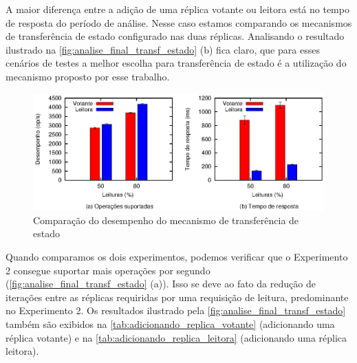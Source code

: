 A maior diferença entre a adição de uma réplica votante ou leitora está no tempo de
resposta do período de análise. Nesse caso estamos comparando os mecanismos de
transferência de estado configurado nas duas réplicas. Analisando o resultado ilustrado na
\autoref{fig:analise_final_transf_estado} (b) fica claro, que para esses cenários de
testes a melhor escolha para transferência de estado é a utilização do mecanismo proposto
por esse trabalho.

\begin{figure}[ht]
  \centering
  \includegraphics[width=14cm]{conteudo/capitulos/figuras/final-transf-estado.eps}
  \caption{Comparação do desempenho do mecanismo de transferência de estado}
  \label{fig:analise_final_transf_estado}
\end{figure}

Quando comparamos os dois experimentos, podemos verificar que o Experimento 2 consegue
suportar mais operações por segundo (\autoref{fig:analise_final_transf_estado} (a)). Isso
se deve ao fato da redução de iterações entre as réplicas requiridas por uma requisição de
leitura, predominante no Experimento 2. Os resultados ilustrado pela
\autoref{fig:analise_final_transf_estado} também são exibidos na
\autoref{tab:adicionando_replica_votante} (adicionando uma réplica votante) e na
\autoref{tab:adicionando_replica_leitora} (adicionando uma réplica leitora).

\begin{table}[htb]
\end{table}

